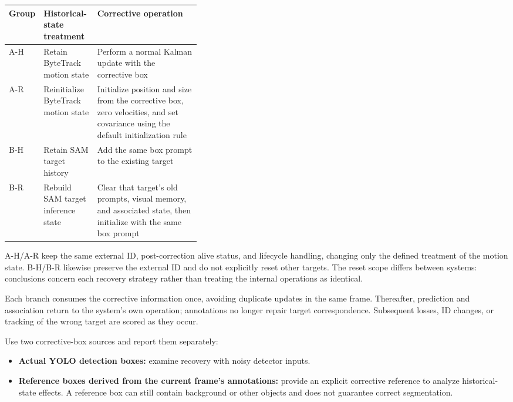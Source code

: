 \documentclass{article}
\begin{document}
\begin{center}
\begin{tabularx}{\linewidth}{@{}p{0.10\linewidth}p{0.28\linewidth}X@{}}
\toprule

Group & Historical-state treatment & Corrective operation \\

\midrule

A-H & Retain ByteTrack motion state & Perform a normal Kalman update with the corrective box \\

\addlinespace[3pt]

A-R & Reinitialize ByteTrack motion state & Initialize position and size from the corrective box, zero velocities, and set covariance using the default initialization rule \\

\addlinespace[3pt]

B-H & Retain SAM target history & Add the same box prompt to the existing target \\

\addlinespace[3pt]

B-R & Rebuild SAM target inference state & Clear that target's old prompts, visual memory, and associated state, then initialize with the same box prompt \\

\bottomrule

\end{tabularx}

\end{center}

A-H/A-R keep the same external ID, post-correction alive status, and lifecycle handling, changing only the defined treatment of the motion state. B-H/B-R likewise preserve the external ID and do not explicitly reset other targets. The reset scope differs between systems: conclusions concern each recovery strategy rather than treating the internal operations as identical.

Each branch consumes the corrective information once, avoiding duplicate updates in the same frame. Thereafter, prediction and association return to the system's own operation; annotations no longer repair target correspondence. Subsequent losses, ID changes, or tracking of the wrong target are scored as they occur.

Use two corrective-box sources and report them separately:

\begin{itemize}

\item \textbf{Actual YOLO detection boxes:} examine recovery with noisy detector inputs.

\item \textbf{Reference boxes derived from the current frame's annotations:} provide an explicit corrective reference to analyze historical-state effects. A reference box can still contain background or other objects and does not guarantee correct segmentation.

\end{itemize}
\end{document}
